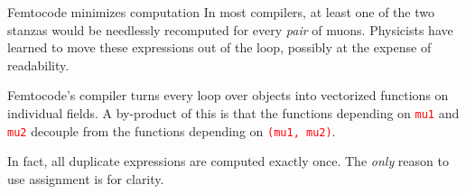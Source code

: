 \documentclass{beamer}
\begin{document}
\begin{frame}{Femtocode minimizes computation}
In most compilers, at least one of the two stanzas would be needlessly recomputed for every {\it pair} of muons. Physicists have learned to move these expressions out of the loop, possibly at the expense of readability.

\vfill
Femtocode's compiler turns every loop over objects into vectorized functions on individual fields. A by-product of this is that the functions depending on \textcolor{red}{\tt mu1} and \textcolor{red}{\tt mu2} decouple from the functions depending on \textcolor{red}{\tt (mu1, mu2)}.

\vfill
In fact, all duplicate expressions are computed exactly once. The {\it only} reason to use assignment is for clarity.
\end{frame}
\end{document}
